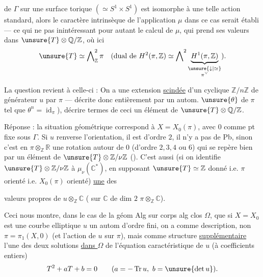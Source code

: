 

de \(\Gamma\) sur une surface torique \((\simeq S^1\times S^1)\)
est isomorphe à une telle action standard, alors le caractère
intrinsèque de l'application \(\mu\) dans ce cas serait établi
--- ce qui ne  pas inintéressant pour autant le calcul
de \(\mu\), qui prend ses valeurs dans
\(\unsure{T}\otimes\mathbb Q/\mathbb Z\), où ici
\[
\unsure{T}\simeq\bigwedge\nolimits_{\mathbb Z}^{2}\pi
\quad
(\text{dual de }H^2(\pi,\mathbb Z)\simeq
\bigwedge\nolimits^{2}
\underbrace{H^1(\pi,\mathbb Z)}_{
\substack{\unsure{\downarrow|\simeq}\\ \pi^\vee}}).
\]

La question revient à celle-ci : On a une extension \uline{scindée}
d'un  cyclique
\(\mathbb Z/n\mathbb Z\) de générateur \(u\) par \(\pi\)
--- décrite donc entièrement par un autom.
 \(\unsure{\theta}\) de \(\pi\) tel que
\(\theta^n=\operatorname{id}_\pi\)), décrire  termes de
ceci un élément de \(\unsure{T}\otimes\mathbb Q/\mathbb Z\).

Réponse : la situation géométrique 
correspond à \(X=X_0(\pi)\), avec \(0\) comme pt fixe sous \(\Gamma\).
Si \(u\) renverse l'orientation, il est d'ordre  \(2\),
il n'y a pas de Pb, sinon c'est  en
\(\pi\otimes_{\mathbb Z}\mathbb R\) une rotation autour de \(0\)
(d'ordre \(2,3,4\) ou \(6\)) qui se repère bien par un élément
de  \(\unsure{T}\otimes\mathbb Z/\nu\mathbb Z\)
().
C'est aussi (si on identifie
\(\unsure{T}\otimes\mathbb Z/\nu\mathbb Z\) à
\(\mu_\nu(\mathbb C^*)\), en supposant
\(\unsure{T}\simeq\mathbb Z\) donné
i.e. \(\pi\) orienté i.e. \(X_0(\pi)\)
 orienté) \uline{une} des 



valeurs propres de \(u\otimes_{\mathbb Z}\mathbb C\)
( sur \(\mathbb C\) de dim \(2\)
\(\pi\otimes_{\mathbb Z}\mathbb C\)).

Ceci nous montre, dans le cas de la géom Alg sur corps alg clos
\(\Omega\), que si \(X=X_0\) est une courbe elliptique
\(u\) un autom d'ordre fini, on a comme description,
 non \uline{}
\(\pi=\pi_1(X,0)\)
(et l'action de \(u\) sur \(\pi\)), mais comme structure
\uline{supplémentaire} l'une des deux solutions \uline{dans \(\Omega\)}
de l'équation caractéristique de \(u\) (à coefficients entiers)
\[
T^2+aT+b=0
\qquad (a=-\operatorname{Tr}u,\ b=\unsure{\det u}).
\]

